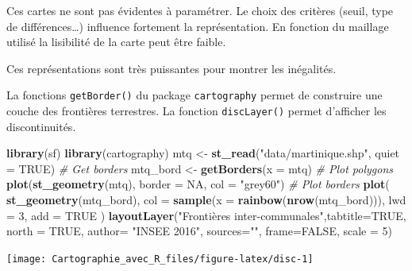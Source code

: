 \documentclass[]{book}
\newenvironment{Shaded}{\begin{snugshade}}{\end{snugshade}}
\newcommand{\KeywordTok}[1]{\textcolor[rgb]{0.13,0.29,0.53}{\textbf{#1}}}
\newcommand{\DataTypeTok}[1]{\textcolor[rgb]{0.13,0.29,0.53}{#1}}
\newcommand{\DecValTok}[1]{\textcolor[rgb]{0.00,0.00,0.81}{#1}}
\newcommand{\StringTok}[1]{\textcolor[rgb]{0.31,0.60,0.02}{#1}}
\newcommand{\CommentTok}[1]{\textcolor[rgb]{0.56,0.35,0.01}{\textit{#1}}}
\newcommand{\OtherTok}[1]{\textcolor[rgb]{0.56,0.35,0.01}{#1}}
\newcommand{\NormalTok}[1]{#1}
\let\BeginKnitrBlock\begin \let\EndKnitrBlock\end
\begin{document}
\BeginKnitrBlock{rmdmoins}
Ces cartes ne sont pas évidentes à paramétrer. Le choix des critères
(seuil, type de différences\ldots{}) influence fortement la
représentation. En fonction du maillage utilisé la lisibilité de la
carte peut être faible.
\EndKnitrBlock{rmdmoins}

\BeginKnitrBlock{rmdplus}
Ces représentations sont très puissantes pour montrer les inégalités.
\EndKnitrBlock{rmdplus}

La fonctions \texttt{getBorder()} du package \texttt{cartography} permet
de construire une couche des frontières terrestres. La fonction
\texttt{discLayer()} permet d'afficher les discontinuités.

\begin{Shaded}
\begin{Highlighting}[]
\KeywordTok{library}\NormalTok{(sf)}
\KeywordTok{library}\NormalTok{(cartography)}
\NormalTok{mtq <-}\StringTok{ }\KeywordTok{st_read}\NormalTok{(}\StringTok{"data/martinique.shp"}\NormalTok{, }\DataTypeTok{quiet =} \OtherTok{TRUE}\NormalTok{)}
\CommentTok{# Get borders}
\NormalTok{mtq_bord <-}\StringTok{ }\KeywordTok{getBorders}\NormalTok{(}\DataTypeTok{x =}\NormalTok{ mtq)}
\CommentTok{# Plot polygons}
\KeywordTok{plot}\NormalTok{(}\KeywordTok{st_geometry}\NormalTok{(mtq), }\DataTypeTok{border =} \OtherTok{NA}\NormalTok{, }\DataTypeTok{col =} \StringTok{"grey60"}\NormalTok{)}
\CommentTok{# Plot borders}
\KeywordTok{plot}\NormalTok{(}
  \KeywordTok{st_geometry}\NormalTok{(mtq_bord), }
  \DataTypeTok{col =} \KeywordTok{sample}\NormalTok{(}\DataTypeTok{x =} \KeywordTok{rainbow}\NormalTok{(}\KeywordTok{nrow}\NormalTok{(mtq_bord))), }
  \DataTypeTok{lwd =} \DecValTok{3}\NormalTok{, }
  \DataTypeTok{add =} \OtherTok{TRUE}
\NormalTok{)}
\KeywordTok{layoutLayer}\NormalTok{(}\StringTok{"Frontières inter-communales"}\NormalTok{,}\DataTypeTok{tabtitle=}\OtherTok{TRUE}\NormalTok{, }\DataTypeTok{north =} \OtherTok{TRUE}\NormalTok{,}
            \DataTypeTok{author=} \StringTok{"INSEE 2016"}\NormalTok{, }\DataTypeTok{sources=}\StringTok{""}\NormalTok{, }\DataTypeTok{frame=}\OtherTok{FALSE}\NormalTok{, }\DataTypeTok{scale =} \DecValTok{5}\NormalTok{)}
\end{Highlighting}
\end{Shaded}

\begin{center}\texttt{[image: Cartographie\_avec\_R\_files/figure-latex/disc-1]} \end{center}
\end{document}
